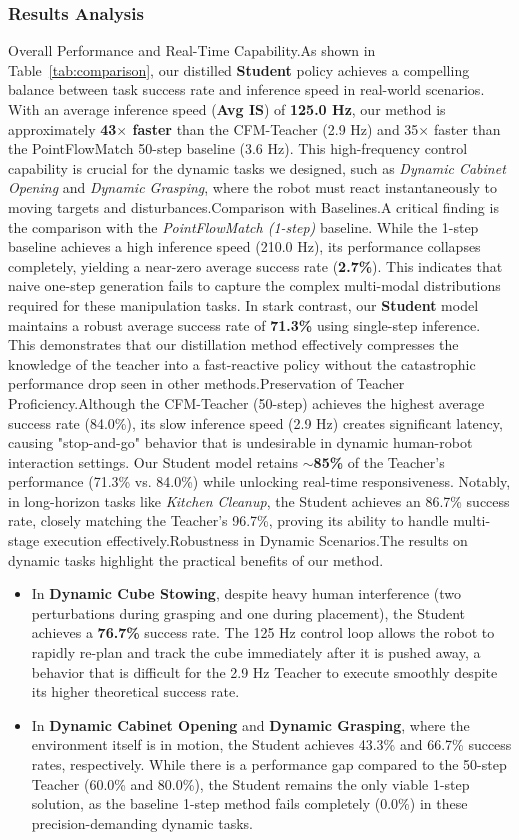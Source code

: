 \subsubsection{Results Analysis}

Overall Performance and Real-Time Capability.As shown in Table~\ref{tab:comparison}, our distilled \textbf{Student} policy achieves a compelling balance between task success rate and inference speed in real-world scenarios. With an average inference speed (\textbf{Avg IS}) of \textbf{125.0 Hz}, our method is approximately \textbf{43$\times$ faster} than the CFM-Teacher (2.9 Hz) and 35$\times$ faster than the PointFlowMatch 50-step baseline (3.6 Hz). This high-frequency control capability is crucial for the dynamic tasks we designed, such as \textit{Dynamic Cabinet Opening} and \textit{Dynamic Grasping}, where the robot must react instantaneously to moving targets and disturbances.Comparison with Baselines.A critical finding is the comparison with the \textit{PointFlowMatch (1-step)} baseline. While the 1-step baseline achieves a high inference speed (210.0 Hz), its performance collapses completely, yielding a near-zero average success rate (\textbf{2.7\%}). This indicates that naive one-step generation fails to capture the complex multi-modal distributions required for these manipulation tasks. In stark contrast, our \textbf{Student} model maintains a robust average success rate of \textbf{71.3\%} using single-step inference. This demonstrates that our distillation method effectively compresses the knowledge of the teacher into a fast-reactive policy without the catastrophic performance drop seen in other methods.Preservation of Teacher Proficiency.Although the CFM-Teacher (50-step) achieves the highest average success rate (84.0\%), its slow inference speed (2.9 Hz) creates significant latency, causing "stop-and-go" behavior that is undesirable in dynamic human-robot interaction settings. Our Student model retains \textbf{$\sim$85\%} of the Teacher's performance (71.3\% vs. 84.0\%) while unlocking real-time responsiveness. Notably, in long-horizon tasks like \textit{Kitchen Cleanup}, the Student achieves an 86.7\% success rate, closely matching the Teacher's 96.7\%, proving its ability to handle multi-stage execution effectively.Robustness in Dynamic Scenarios.The results on dynamic tasks highlight the practical benefits of our method.\begin{itemize}\item In \textbf{Dynamic Cube Stowing}, despite heavy human interference (two perturbations during grasping and one during placement), the Student achieves a \textbf{76.7\%} success rate. The 125 Hz control loop allows the robot to rapidly re-plan and track the cube immediately after it is pushed away, a behavior that is difficult for the 2.9 Hz Teacher to execute smoothly despite its higher theoretical success rate.\item In \textbf{Dynamic Cabinet Opening} and \textbf{Dynamic Grasping}, where the environment itself is in motion, the Student achieves 43.3\% and 66.7\% success rates, respectively. While there is a performance gap compared to the 50-step Teacher (60.0\% and 80.0\%), the Student remains the only viable 1-step solution, as the baseline 1-step method fails completely (0.0\%) in these precision-demanding dynamic tasks.\end{itemize}